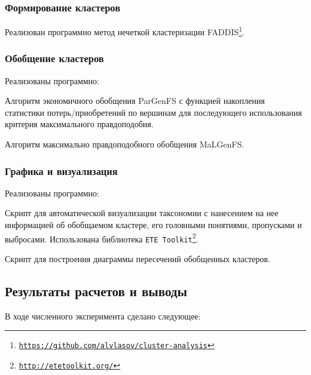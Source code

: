 \documentclass[12pt]{article}
\newenvironment{itemize*}%
{\begin{itemize}%
	\setlength{\itemsep}{0pt}%
	\setlength{\parskip}{0pt}}%
{\end{itemize}}
\newcommand{\hrefl}[1] {\texttt{\href{#1}{#1}}}
\let\oldsubsection\subsection
\renewcommand{\subsection}{\clearpage\oldsubsection}
\begin{document}
\subsubsection{Формирование кластеров}
Реализован программно метод нечеткой кластеризации FADDIS\footnote{\hrefl{https://github.com/alvlasov/cluster-analysis}}.

\subsubsection{Обобщение кластеров}
Реализованы программно:
\begin{itemize*}
	\item Алгоритм экономичного обобщения ParGenFS с функцией накопления статистики потерь/приобретений по вершинам для последующего использования критерия максимального правдоподобия.
	\item Алгоритм максимально правдоподобного обобщения MaLGenFS.
\end{itemize*}

\subsubsection{Графика и визуализация}
Реализованы программно:

\begin{itemize*}
	\item Скрипт для автоматической визуализации таксономии с нанесением на нее информацией об обобщаемом кластере, его головными понятиями, пропусками и выбросами. Использована библиотека \texttt{ETE Toolkit}\footnote{\hrefl{http://etetoolkit.org/}}.
	\item Скрипт для построения диаграммы пересечений обобщенных кластеров.	
\end{itemize*}

\subsection{Результаты расчетов и выводы}

В ходе численного эксперимента сделано следующее:
\end{document}
